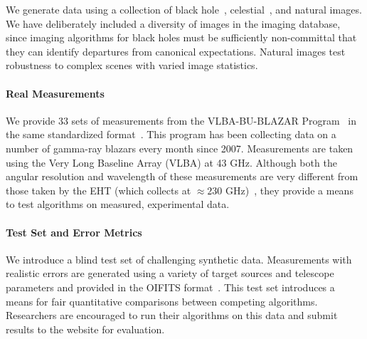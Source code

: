 We generate data using a collection of black hole~\cite{avery}, celestial~\cite{jpl, nrao}, and natural images. 
We have deliberately included a diversity of images in the imaging database, since imaging algorithms for black holes must be sufficiently non-committal that they can identify departures from canonical expectations. %
Natural images test robustness to complex scenes with varied image statistics.

\vspace{-.15in}
\paragraph{Real Measurements} We provide 33 sets of measurements from the VLBA-BU-BLAZAR Program~\cite{jorstad2005polarimetric} in the same standardized format~\cite{ pauls2005data}. 
This program has been collecting data on a number of gamma-ray blazars every month since 2007. 
Measurements are taken using the Very Long Baseline Array (VLBA) at 43 GHz. Although both the angular resolution and wavelength of these measurements are very different from those taken by the EHT (which collects at $\approx 230$ GHz)~\cite{fish2014imaging}, they provide a means to test algorithms on measured, experimental data. 

\vspace{-.15in}
\paragraph{Test Set and Error Metrics}

We introduce a blind test set of
challenging synthetic data. %
Measurements with realistic errors are generated using a variety of target sources and telescope parameters and provided in the OIFITS format~\cite{pauls2005data}.
This test set introduces a means for fair quantitative comparisons between competing algorithms. Researchers are encouraged to run their algorithms on this data and submit results to the website for evaluation. 


